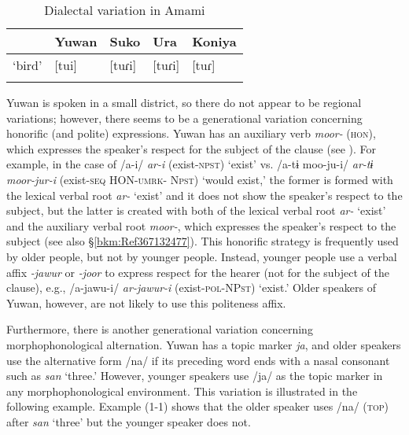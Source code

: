\begin{table}
\caption{Dialectal variation in Amami\label{tab:key:1}}
\begin{tabular}{lllll} 
\lsptoprule
       & Yuwan & Suko & Ura & Koniya\\\midrule
‘bird’ & [tui] & [tuɾi] &  [tuɾi] &  [tuɾ]\\
\lspbottomrule
\end{tabular}
\end{table}

Yuwan is spoken in a small district, so there do not appear to be regional variations; however, there seems to be a generational variation concerning honorific (and polite) expressions. Yuwan has an auxiliary verb \textit{moor-} (\textsc{hon}), which expresses the speaker’s respect for the subject of the clause (see ). For example, in the case of /a-i/ \textit{ar-i} (exist-\textsc{npst}) ‘exist’ vs. /a-tɨ moo-ju-i/ \textit{ar-tɨ} \textit{moor-jur-i} (exist-\textsc{seq} HON-\textsc{umrk}- N\textsc{pst}) ‘would exist,’ the former is formed with the lexical verbal root \textit{ar-} ‘exist’ and it does not show the speaker’s respect to the subject, but the latter is created with both of the lexical verbal root \textit{ar-} ‘exist’ and the auxiliary verbal root \textit{moor-}, which expresses the speaker’s respect to the subject (see also §\ref{bkm:Ref367132477}). This honorific strategy is frequently used by older people, but not by younger people. Instead, younger people use a verbal affix \textit{{}-jawur} or \textit{{}-joor} to express respect for the hearer (not for the subject of the clause), e.g., /a-jawu-i/ \textit{ar-jawur-i} (exist-\textsc{pol}-NP\textsc{st}) ‘exist.’ Older speakers of Yuwan, however, are not likely to use this politeness affix.

Furthermore, there is another generational variation concerning morphophonological alternation. Yuwan has a topic marker \textit{ja}, and older speakers use the alternative form /na/ if its preceding word ends with a nasal consonant such as \textit{san} ‘three.’ However, younger speakers use /ja/ as the topic marker in any morphophonological environment. This variation is illustrated in the following example. Example (1-1) shows that the older speaker uses /na/ (\textsc{top}) after \textit{san} ‘three’ but the younger speaker does not.

